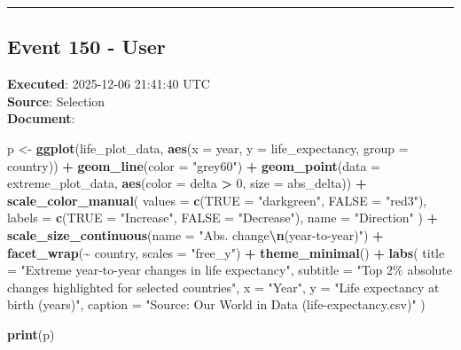 \documentclass[
  11pt,
]{article}
\newenvironment{Shaded}{\begin{snugshade}}{\end{snugshade}}
\newcommand{\AttributeTok}[1]{\textcolor[rgb]{0.13,0.29,0.53}{#1}}
\newcommand{\DecValTok}[1]{\textcolor[rgb]{0.00,0.00,0.81}{#1}}
\newcommand{\FunctionTok}[1]{\textcolor[rgb]{0.13,0.29,0.53}{\textbf{#1}}}
\newcommand{\NormalTok}[1]{#1}
\newcommand{\OtherTok}[1]{\textcolor[rgb]{0.56,0.35,0.01}{#1}}
\newcommand{\SpecialCharTok}[1]{\textcolor[rgb]{0.81,0.36,0.00}{\textbf{#1}}}
\newcommand{\StringTok}[1]{\textcolor[rgb]{0.31,0.60,0.02}{#1}}
\begin{document}
\begin{center}\rule{0.5\linewidth}{0.5pt}\end{center}

\subsection{Event 150 - User}\label{event-150---user}

\textbf{Executed}: 2025-12-06 21:41:40 UTC\\
\textbf{Source}: Selection\\
\textbf{Document}:

\begin{Shaded}
\begin{Highlighting}[]
\NormalTok{p }\OtherTok{\textless{}{-}} \FunctionTok{ggplot}\NormalTok{(life\_plot\_data, }\FunctionTok{aes}\NormalTok{(}\AttributeTok{x =}\NormalTok{ year, }\AttributeTok{y =}\NormalTok{ life\_expectancy, }\AttributeTok{group =}\NormalTok{ country)) }\SpecialCharTok{+}
  \FunctionTok{geom\_line}\NormalTok{(}\AttributeTok{color =} \StringTok{"grey60"}\NormalTok{) }\SpecialCharTok{+}
  \FunctionTok{geom\_point}\NormalTok{(}\AttributeTok{data =}\NormalTok{ extreme\_plot\_data,}
             \FunctionTok{aes}\NormalTok{(}\AttributeTok{color =}\NormalTok{ delta }\SpecialCharTok{\textgreater{}} \DecValTok{0}\NormalTok{, }\AttributeTok{size =}\NormalTok{ abs\_delta)) }\SpecialCharTok{+}
  \FunctionTok{scale\_color\_manual}\NormalTok{(}
    \AttributeTok{values =} \FunctionTok{c}\NormalTok{(}\StringTok{\textasciigrave{}}\AttributeTok{TRUE}\StringTok{\textasciigrave{}} \OtherTok{=} \StringTok{"darkgreen"}\NormalTok{, }\StringTok{\textasciigrave{}}\AttributeTok{FALSE}\StringTok{\textasciigrave{}} \OtherTok{=} \StringTok{"red3"}\NormalTok{),}
    \AttributeTok{labels =} \FunctionTok{c}\NormalTok{(}\StringTok{\textasciigrave{}}\AttributeTok{TRUE}\StringTok{\textasciigrave{}} \OtherTok{=} \StringTok{"Increase"}\NormalTok{, }\StringTok{\textasciigrave{}}\AttributeTok{FALSE}\StringTok{\textasciigrave{}} \OtherTok{=} \StringTok{"Decrease"}\NormalTok{),}
    \AttributeTok{name =} \StringTok{"Direction"}
\NormalTok{  ) }\SpecialCharTok{+}
  \FunctionTok{scale\_size\_continuous}\NormalTok{(}\AttributeTok{name =} \StringTok{"Abs. change}\SpecialCharTok{\textbackslash{}n}\StringTok{(year{-}to{-}year)"}\NormalTok{) }\SpecialCharTok{+}
  \FunctionTok{facet\_wrap}\NormalTok{(}\SpecialCharTok{\textasciitilde{}}\NormalTok{ country, }\AttributeTok{scales =} \StringTok{"free\_y"}\NormalTok{) }\SpecialCharTok{+}
  \FunctionTok{theme\_minimal}\NormalTok{() }\SpecialCharTok{+}
  \FunctionTok{labs}\NormalTok{(}
    \AttributeTok{title =} \StringTok{"Extreme year{-}to{-}year changes in life expectancy"}\NormalTok{,}
    \AttributeTok{subtitle =} \StringTok{"Top 2\% absolute changes highlighted for selected countries"}\NormalTok{,}
    \AttributeTok{x =} \StringTok{"Year"}\NormalTok{,}
    \AttributeTok{y =} \StringTok{"Life expectancy at birth (years)"}\NormalTok{,}
    \AttributeTok{caption =} \StringTok{"Source: Our World in Data (life{-}expectancy.csv)"}
\NormalTok{  )}

\FunctionTok{print}\NormalTok{(p)}
\end{Highlighting}
\end{Shaded}
\end{document}
